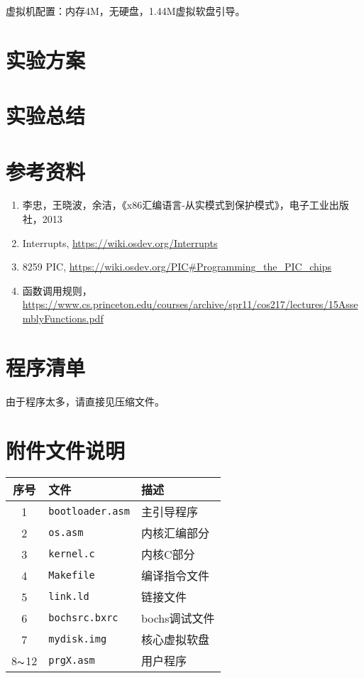 \documentclass[logo,reportComp]{thesis}
\begin{document}
虚拟机配置：内存4M，无硬盘，1.44M虚拟软盘引导。

\section{实验方案}


\section{实验总结}


\section{参考资料}
\begin{enumerate}
	\item 李忠，王晓波，余洁，《x86汇编语言-从实模式到保护模式》，电子工业出版社，2013
	\item Interrupts, \url{https://wiki.osdev.org/Interrupts}
	\item 8259 PIC, \url{https://wiki.osdev.org/PIC#Programming_the_PIC_chips}
	\item 函数调用规则，\url{https://www.cs.princeton.edu/courses/archive/spr11/cos217/lectures/15AssemblyFunctions.pdf}
\end{enumerate}

\appendix
\appendixconfig
\section{程序清单}
\label{sec:code}
由于程序太多，请直接见压缩文件。

\section{附件文件说明}
\begin{center}
\begin{tabular}{|c|l|l|}\hline
序号 & 文件 & 描述 \\\hline
1 & \verb'bootloader.asm' & 主引导程序\\\hline
2 & \verb'os.asm' & 内核汇编部分\\\hline
3 & \verb'kernel.c' & 内核C部分\\\hline
4 & \verb'Makefile' & 编译指令文件\\\hline
5 & \verb'link.ld' & 链接文件\\\hline
6 & \verb'bochsrc.bxrc' & bochs调试文件\\\hline
7 & \verb'mydisk.img' & 核心虚拟软盘\\\hline
8$\thicksim$12 & \verb'prgX.asm' & 用户程序\\\hline
\end{tabular}
\end{center}
\end{document}
